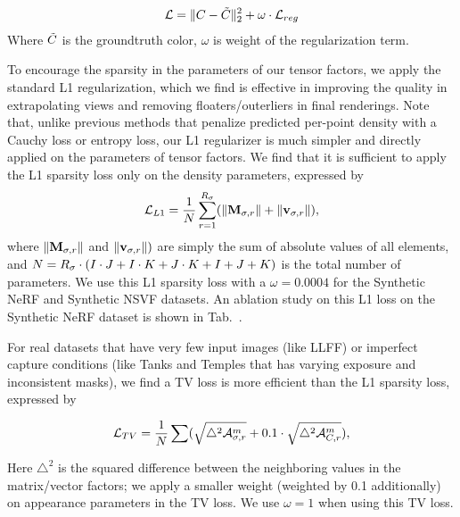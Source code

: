 \documentclass[runningheads]{llncs}
\begin{document}
\begin{equation}
\begin{aligned}
    \mathcal{L} = \|C - \tilde{C} \|^2_2 + \omega  \cdot \mathcal{L}_{reg}
\label{eq:loss}
\end{aligned}
\end{equation}
Where $\tilde{C}$ is the groundtruth color, $\omega$ is weight of the regularization term.

To encourage the sparsity in the parameters of our tensor factors, we apply the standard L1 regularization, which we find is effective in improving the quality in extrapolating views and removing floaters/outerliers in final renderings. Note that, unlike previous methods \cite{hedman2021baking,sun2021direct} that penalize predicted per-point density with a Cauchy loss or entropy loss, our L1 regularizer is much simpler and directly applied on the parameters of tensor factors. 
We find that it is sufficient to  apply the L1 sparsity loss only on the density parameters, expressed by
\begin{equation}
\begin{aligned}
    \mathcal{L}_{L1} = \frac{1}{N}\sum_{r=1}^{R_\sigma} (\|\mathbf{M}_{\sigma,r}\| + \|\mathbf{v}_{\sigma, r}\|),
\label{eq:loss_reg}
\end{aligned}
\end{equation}
where $\|\mathbf{M}_{\sigma,r}\|$ and $\|\mathbf{v}_{\sigma, r}\|)$ are simply the sum of absolute values of all elements, and $N= R_\sigma \cdot (I \cdot J + I \cdot K+J \cdot K + I + J + K)$ is the total number of parameters.
We use this L1 sparsity loss with a $\omega=0.0004$ for the Synthetic NeRF and Synthetic NSVF datasets. An ablation study on this L1 loss on the Synthetic NeRF dataset is shown in Tab.~\label{tab:ab_regularization}.

For real datasets that have very few input images (like LLFF\cite{llff}) or imperfect capture conditions (like Tanks and Temples \cite{Knapitsch2017} that has varying exposure and inconsistent masks), we find a TV loss is more efficient
than the L1 sparsity loss, expressed by

\begin{equation}
\begin{aligned}
    \mathcal{L}_{TV} =  \frac{1}{N} \sum (\sqrt{\triangle^2 \mathcal{A}^m_{\sigma,r}} + 0.1 \cdot \sqrt{\triangle^2 \mathcal{A}^m_{C,r}}),
\label{eq:loss_reg}
\end{aligned}
\end{equation}

Here $\triangle^2$ is the squared difference between the neighboring values in the matrix/vector factors; we apply a smaller weight (weighted by 0.1 additionally) on appearance parameters in the TV loss.
We use $\omega=1$ when using this TV loss.
\end{document}
